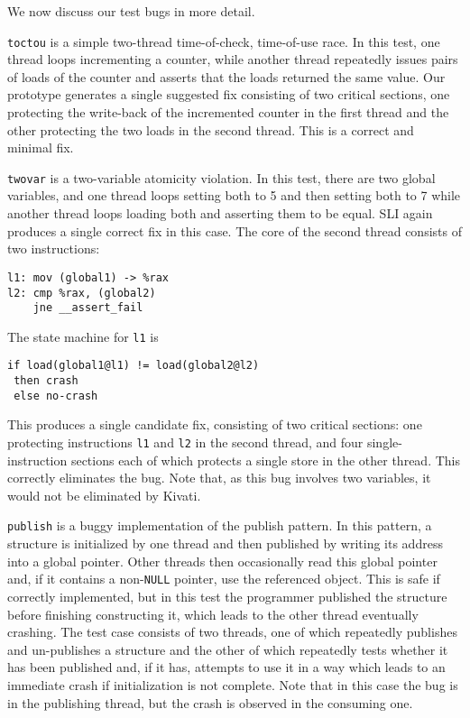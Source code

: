 \documentclass[10pt,twocolumn,preprint,natbib,authoryear]{sigplanconf}
\begin{document}
We now discuss our test bugs in more detail.

\verb|toctou| is a simple two-thread time-of-check, time-of-use race.
In this test, one thread loops incrementing a counter, while another
thread repeatedly issues pairs of loads of the counter and asserts
that the loads returned the same value.  Our prototype generates a
single suggested fix consisting of two critical sections, one
protecting the write-back of the incremented counter in the first
thread and the other protecting the two loads in the second thread.
This is a correct and minimal fix.

\verb|twovar| is a two-variable atomicity violation.  In this test,
there are two global variables, and one thread loops setting both to 5
and then setting both to 7 while another thread loops loading both and
asserting them to be equal.  SLI again produces a single correct fix
in this case.  The core of the second thread consists of two
instructions:

\begin{verbatim}
l1: mov (global1) -> %rax
l2: cmp %rax, (global2)
    jne __assert_fail
\end{verbatim}

The state machine for \verb|l1| is

\begin{verbatim}
if load(global1@l1) != load(global2@l2)
 then crash
 else no-crash
\end{verbatim}

\noindent
This produces a single candidate fix, consisting of two critical
sections: one protecting instructions \verb|l1| and \verb|l2| in the
second thread, and four single-instruction sections each of which
protects a single store in the other thread.  This correctly
eliminates the bug.  Note that, as this bug involves two variables, it
would not be eliminated by Kivati\cite{Chew2010a}.

\verb|publish| is a buggy implementation of the publish pattern.  In
this pattern, a structure is initialized by one thread and then
published by writing its address into a global pointer.  Other threads
then occasionally read this global pointer and, if it contains a
non-\verb|NULL| pointer, use the referenced object.  This is safe if
correctly implemented, but in this test the programmer published the
structure before finishing constructing it, which leads to the other
thread eventually crashing.  The test case consists of two threads,
one of which repeatedly publishes and un-publishes a structure and the
other of which repeatedly tests whether it has been published and, if
it has, attempts to use it in a way which leads to an immediate crash
if initialization is not complete.  Note that in this case the bug is
in the publishing thread, but the crash is observed in the consuming
one.
\end{document}

